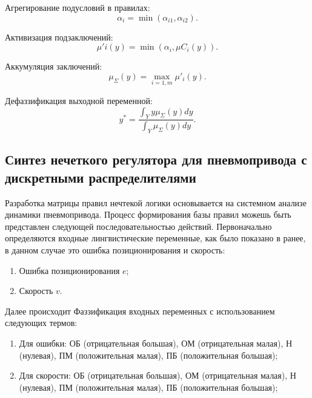 Агрегирование подусловий в правилах:
\begin{equation*}
	\alpha_i = \min(\alpha_{i1}, \alpha_{i2}).
\end{equation*}

Активизация подзаключений:
\begin{equation*}
	\mu'i(y) = \min(\alpha_i, \mu{C_i}(y)).
\end{equation*}

Аккумуляция заключений:
\begin{equation*}
	\mu_\Sigma(y) = \max_{i=1,m}\mu'_i(y).
\end{equation*}

Дефаззификация выходной переменной:
\begin{equation*}
	y^* = \frac{\int_Y y\mu_\Sigma(y)dy}{\int_Y \mu_\Sigma(y)dy}.
\end{equation*}

\subsection{Синтез нечеткого регулятора для пневмопривода с дискретными распределителями}\label{subsec:ch3/sec4/sub2}

Разработка матрицы правил нечтекой логики основывается на системном
анализе динамики пневмопривода. Процесс формирования базы правил можешь быть представлен
следующей последовательностью действий.
Первоначально определяются входные лингвистические переменные, как было показано в ранее, в данном случае это ошибка позиционирования и скорость:
\begin{enumerate}
	\item Ошибка позиционирования $e$;
	\item Скорость $v$.
\end{enumerate}

Далее происходит Фаззификация входных переменных с использованием следующих термов:
\begin{enumerate}
	\item Для ошибки: {ОБ (отрицательная большая),
	      ОМ (отрицательная малая),
	      Н (нулевая),
	      ПМ (положительная малая),
	      ПБ (положительная большая)};

	\item Для скорости: {ОБ (отрицательная большая),
	      ОМ (отрицательная малая),
	      Н (нулевая),
	      ПМ (положительная малая),
	      ПБ (положительная большая)};
\end{enumerate}

